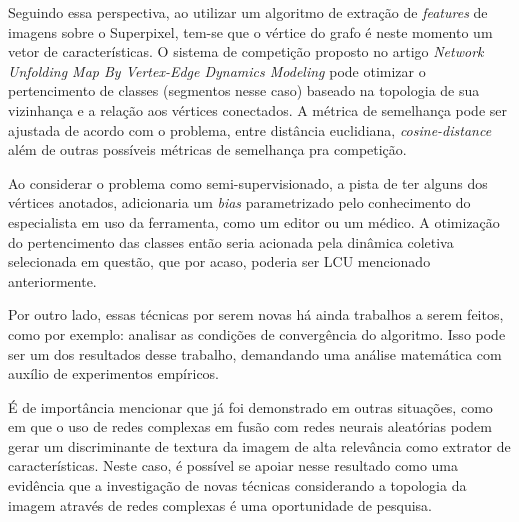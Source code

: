 Seguindo essa perspectiva, ao utilizar um algoritmo de extração de
\textit{features} de imagens sobre o Superpixel, tem-se que o vértice
do grafo é neste momento um vetor de características. O sistema de
competição proposto no artigo \textit{Network Unfolding Map By
Vertex-Edge Dynamics Modeling} pode otimizar o pertencimento de
classes (segmentos nesse caso) baseado na topologia de sua vizinhança
e a relação aos vértices conectados. A métrica de semelhança pode ser
ajustada de acordo com o problema, entre distância euclidiana,
\textit{cosine-distance} além de outras possíveis métricas de
semelhança pra competição.

Ao considerar o problema como semi-supervisionado, a pista de ter
alguns dos vértices anotados, adicionaria um \textit{bias}
parametrizado pelo conhecimento do especialista em uso da ferramenta,
como um editor ou um médico. A otimização do pertencimento das classes
então seria acionada pela dinâmica coletiva selecionada em questão,
que por acaso, poderia ser LCU mencionado anteriormente.

Por outro lado, essas técnicas por serem novas há ainda trabalhos a
serem feitos, como por exemplo: analisar as condições de convergência
do algoritmo. Isso pode ser um dos resultados desse trabalho,
demandando uma análise matemática com auxílio de experimentos empíricos.

É de importância mencionar que já foi demonstrado em outras situações,
como em \cite{JarbasComplexNetworks2020} que o uso de redes complexas
em fusão com redes neurais aleatórias podem gerar um discriminante de
textura da imagem de alta relevância como extrator de
características. Neste caso, é possível se apoiar nesse resultado como
uma evidência que a investigação de novas técnicas considerando a
topologia da imagem através de redes complexas é uma oportunidade de
pesquisa.
